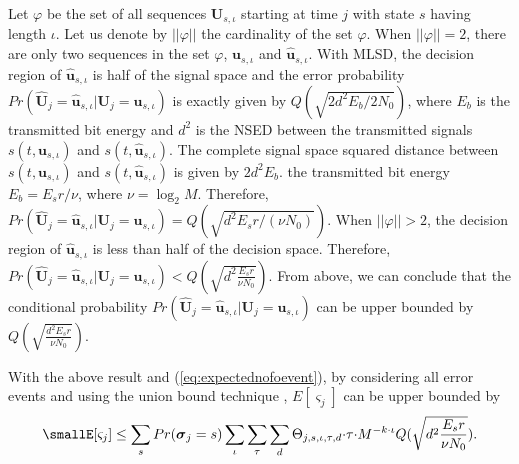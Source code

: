 \documentclass[12pt,twoside,onecolumn,a4paper,english]{IEEEtran2e}
\begin{document}
Let $\varphi$ be the set of all sequences
$\mathbf{\boldsymbol{U}}_{s,\iota}$ starting at time $j$ with state
$s$ having length $\iota$. Let us denote by $||\varphi||$ the cardinality of
the set $\varphi$. When $||\varphi||=2$, there are only two
sequences in the set $\varphi$, $\mathbf{\boldsymbol{u}}_{s,\iota}$
and $\hat{\mathbf{\boldsymbol{u}}}_{s,\iota}$. With MLSD, the decision
region of $\hat{\mathbf{\boldsymbol{u}}}_{s,\iota}$ is half of the
signal space and the error probability
$Pr(\hat{\mathbf{\boldsymbol{U}}}_j=\hat{\mathbf{\boldsymbol{u}}}_{s,\iota}|{\mathbf{\boldsymbol{U}}}_j={\mathbf{\boldsymbol{u}}}_{s,\iota})$
is exactly given by $Q(\sqrt{2d^2{E_b}/{2N_0}})$, where $E_b$ is the transmitted bit energy and %
$d^2$ is the NSED between the transmitted signals
$s(t,{\mathbf{\boldsymbol{u}}}_{s,\iota})$ and
$s(t,\hat{\mathbf{\boldsymbol{u}}}_{s,\iota})$. The complete signal
space squared distance between
$s(t,{\mathbf{\boldsymbol{u}}}_{s,\iota})$ and
$s(t,\hat{\mathbf{\boldsymbol{u}}}_{s,\iota})$ is given by
$2d^2{E_b}$. %
the transmitted bit energy
$E_b=E_sr/\nu$, where $\nu=\log_2M$. Therefore,
$Pr(\hat{\mathbf{\boldsymbol{U}}}_j=\hat{\mathbf{\boldsymbol{u}}}_{s,\iota}|{\mathbf{\boldsymbol{U}}}_j={\mathbf{\boldsymbol{u}}}_{s,\iota})=Q(\sqrt{d^2{E_sr}/{(\nu
N_0)}})$.
 When
$||\varphi||>2$, the decision region of
$\hat{\mathbf{\boldsymbol{u}}}_{s,\iota}$ is less than half of the
decision space. Therefore,
$Pr(\hat{\mathbf{\boldsymbol{U}}}_j=\hat{\mathbf{\boldsymbol{u}}}_{s,\iota}|{\mathbf{\boldsymbol{U}}}_j={\mathbf{\boldsymbol{u}}}_{s,\iota})<Q(\sqrt{d^2\frac{E_sr}{\nu
N_0}})$.
From above, we can conclude that
the conditional probability
$Pr(\hat{\mathbf{\boldsymbol{U}}}_j=\hat{\mathbf{\boldsymbol{u}}}_{s,\iota}|{\mathbf{\boldsymbol{U}}}_j={\mathbf{\boldsymbol{u}}}_{s,\iota})$
can be upper bounded by $Q(\sqrt{\frac{d^2{E_sr}}{{\nu N_0}}})$.

With the above result and (\ref{eq:expectednofoevent}), by considering
all error events and using the union bound technique \cite{viterbi},
$E[\varsigma_j]$
can be upper bounded by %
\begin{eqnarray}\label{eq:ej}\small%
E[\varsigma_j]%
\leq
\sum_{s}Pr({\mathbf{\boldsymbol{\sigma}}}_j=s)\sum_\iota\sum_\tau\sum_d{\Theta_{j,s,\iota,\tau,d}}{\cdot}{\tau}{\cdot}M^{-k{\cdot}\iota}%
Q(\sqrt{d^2\frac{E_sr}{\nu N_0}}).
\end{eqnarray}
\end{document}
